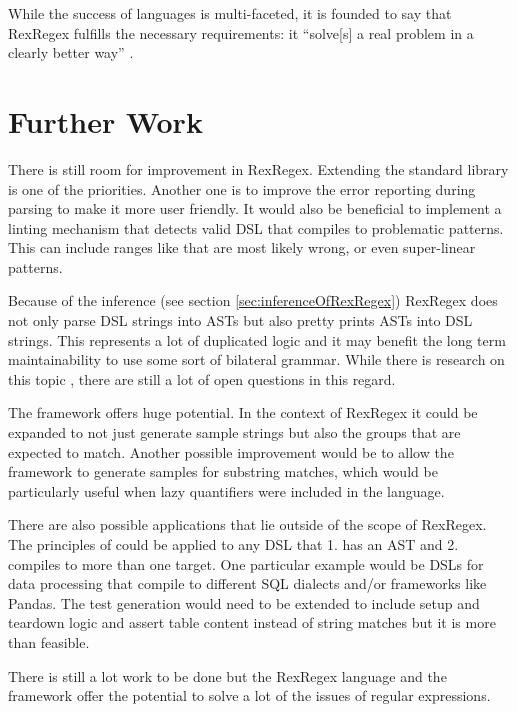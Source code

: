 While the success of languages is multi-faceted, it is founded to say that RexRegex fulfills the necessary requirements: it \enquote{solve[s] a real problem in a clearly better way} \cite{OnSuccessfulLanuageDesignKernighan}.



\section{Further Work}

There is still room for improvement in RexRegex. Extending the standard library is one of the priorities. Another one is to improve the error reporting during parsing to make it more user friendly. It would also be beneficial to implement a linting mechanism that detects valid DSL that compiles to problematic patterns. This can include ranges like  that are most likely wrong, or even super-linear patterns.

Because of the inference (see section \ref{sec:inferenceOfRexRegex}) RexRegex does not only parse DSL strings into ASTs but also pretty prints ASTs into DSL strings. This represents a lot of duplicated logic and it may benefit the long term maintainability to use some sort of bilateral grammar. While there is research on this topic \cite{BidirectionalGrammarsForMachineCode}\cite{GuidedGrammarConvergence}, there are still a lot of open questions in this regard.

The \utgast{} framework offers huge potential. In the context of RexRegex it could be expanded to not just generate sample strings but also the groups that are expected to match. Another possible improvement would be to allow the framework to generate samples for substring matches, which would be particularly useful when lazy quantifiers were included in the language.

There are also possible applications that lie outside of the scope of RexRegex. The principles of \utgast{} could be applied to any DSL that 1. has an AST and 2. compiles to more than one target. One particular example would be DSLs for data processing that compile to different SQL dialects and/or frameworks like Pandas. The test generation would need to be extended to include setup and teardown logic and assert table content instead of string matches but it is more than feasible. 

There is still a lot work to be done but the RexRegex language and the \utgast{} framework offer the potential to solve a lot of the issues of regular expressions.
